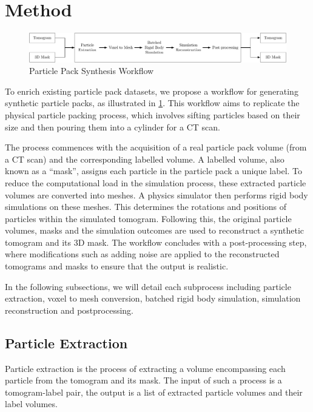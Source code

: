 \documentclass[preprint,12pt]{elsarticle}
\begin{document}
\section{Method}\label{sec:method}
\begin{figure}
    \includegraphics[width=\textwidth]{figures/pdf/synthesis-workflow.pdf}
    \caption{Particle Pack Synthesis Workflow}
    \label{fig:workflow}
\end{figure}
To enrich existing particle pack datasets, we propose a workflow for generating synthetic particle packs, as illustrated in \cref{fig:workflow}.
This workflow aims to replicate the physical particle packing process, which involves sifting particles based on their size and then pouring them into a cylinder for a CT scan.
\par
The process commences with the acquisition of a real particle pack volume (from a CT scan) and the corresponding labelled volume.
A labelled volume, also known as a ``mask'', assigns each particle in the particle pack a unique label.
To reduce the computational load in the simulation process, these extracted particle volumes are converted into meshes. 
A physics simulator then performs rigid body simulations on these meshes. 
This determines the rotations and positions of particles within the simulated tomogram.
Following this, the original particle volumes, masks and the simulation outcomes are used to reconstruct a synthetic tomogram and its 3D mask. 
The workflow concludes with a post-processing step, where modifications such as adding noise are applied to the reconstructed tomograms and masks to ensure that the output is realistic.
\par
In the following subsections, we will detail each subprocess including particle extraction, voxel to mesh conversion, batched rigid body simulation, simulation reconstruction and postprocessing.
\subsection{Particle Extraction} \label{sec:method:subsec:particle_extraction}
Particle extraction is the process of extracting a volume encompassing each particle from the tomogram and its mask.
The input of such a process is a tomogram-label pair, the output is a list of extracted particle volumes and their label volumes. 
\end{document}
